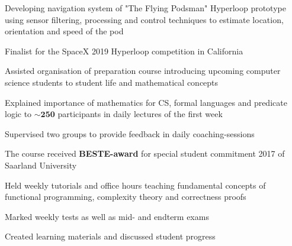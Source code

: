 \documentclass[]{lukas-cv}
\begin{document}
\begin{minipage}[t]{0.66\textwidth}

\begin{tightemize}
    \item Developing navigation system of "The Flying Podsman" Hyperloop prototype using sensor filtering, processing and control techniques to estimate location, orientation and speed of the pod
    \item Finalist for the SpaceX 2019 Hyperloop competition in California
\end{tightemize}
\sectionsep



\begin{tightemize}
    \item Assisted organisation of preparation course introducing upcoming computer science students to student life and mathematical concepts %
    \item Explained importance of mathematics for CS, formal languages and predicate logic to $\mathbf{\sim 250}$ participants in daily lectures of the first week
    \item Supervised two groups to provide feedback in daily coaching-sessions
    \item The course received \textbf{BESTE-award} for special student commitment 2017 of Saarland University
\end{tightemize}
\sectionsep

\begin{tightemize}
    \item Held weekly tutorials and office hours teaching fundamental concepts of functional programming, complexity theory and correctness proofs
    \item Marked weekly tests as well as mid- and endterm exams
    \item Created learning materials and discussed student progress
\end{tightemize}
\sectionsep



\end{minipage}
\end{document}

